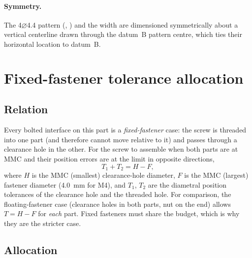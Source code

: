 \documentclass[11pt,letterpaper]{article}
\newcommand{\dia}{$\varnothing$}
\newcommand{\basic}[1]{\fbox{\kern-1pt\small #1\kern-1pt}}
\begin{document}
\paragraph{Symmetry.}
The 4\texttimes\dia4.4 pattern (\basic{18}, \basic{45}) and the \basic{70} width are dimensioned
symmetrically about a vertical centerline drawn through the datum~B pattern centre, which ties
their horizontal location to datum~B.

\section{Fixed-fastener tolerance allocation}
\label{sec:fastener}

\subsection{Relation}

Every bolted interface on this part is a \emph{fixed-fastener} case: the screw is threaded into
one part (and therefore cannot move relative to it) and passes through a clearance hole in the
other. For the screw to assemble when both parts are at MMC and their position errors are at
the limit in opposite directions,
\begin{equation}
  T_1 + T_2 = H - F,
  \label{eq:fixed}
\end{equation}
where $H$ is the MMC (smallest) clearance-hole diameter, $F$ is the MMC (largest) fastener
diameter (\SI{4.0}{mm} for M4), and $T_1$, $T_2$ are the diametral position tolerances of the
clearance hole and the threaded hole. For comparison, the floating-fastener case (clearance holes
in both parts, nut on the end) allows $T = H - F$ for \emph{each} part. Fixed fasteners must
share the budget, which is why they are the stricter case.

\subsection{Allocation}
\end{document}
